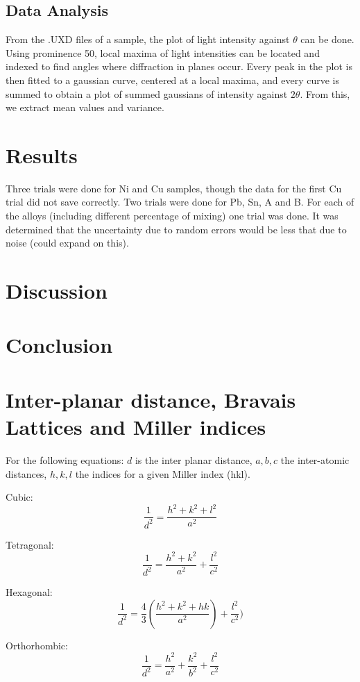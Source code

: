 \documentclass[12pt]{article}
\begin{document}
\subsection{Data Analysis}
From the .UXD files of a sample, the plot of light intensity against $\theta$ can be done. Using prominence 50, 
local maxima of light intensities can be located and indexed to find angles where diffraction in planes
occur. Every peak in the plot is then fitted to a gaussian curve, centered at a local maxima,
and every curve is summed to obtain a plot of summed gaussians of
intensity against $2\theta$. From this, we extract mean values and variance. 


\section{Results}\label{sec:res}
Three trials were done for Ni and Cu samples, though the data for the first Cu trial did not save correctly.
Two trials were done for Pb, Sn, A and B. For each of the alloys (including different percentage of mixing) 
one trial was done. It was determined that the uncertainty due to random errors would be 
less that due to noise (could expand on this).












\section{Discussion}\label{sec:dis}

\section{Conclusion}\label{sec:con}







\appendix
\renewcommand{\thesection}{Appendix \Alph{section}. }
\renewcommand{\thesubsection}{\Alph{section}.\arabic{subsection}. }

\section{Inter-planar distance, Bravais Lattices and Miller indices}\label{A:brav_eq}

For the following equations: $d$ is the inter planar distance, $a,b,c$
the inter-atomic distances, $h,k,l$ the indices for a given Miller index (hkl).

Cubic: \[\frac{1}{d^2}=\frac{h^2+k^2+l^2}{a^2}\]

Tetragonal: \[\frac{1}{d^2}=\frac{h^2+k^2}{a^2}+\frac{l^2}{c^2}\]

Hexagonal: \[\frac{1}{d^2}=\frac{4}{3}(\frac{h^2+k^2+hk}{a^2})+\frac{l^2}{c^2})\]

Orthorhombic: \[\frac{1}{d^2}=\frac{h^2}{a^2}+\frac{k^2}{b^2}+\frac{l^2}{c^2}\]
\end{document}
